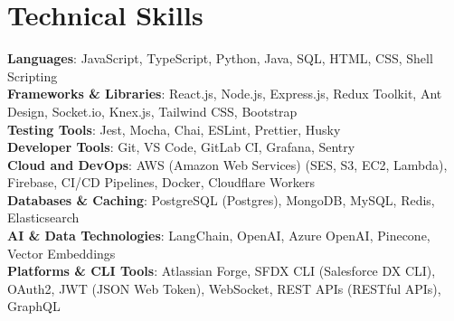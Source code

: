\documentclass[letterpaper,11pt]{article}
\begin{document}
\section{\textbf {Technical Skills}}
\begin{itemize}[leftmargin=0.15in, label={}]
    \small{\item{
       \textbf{Languages}{: JavaScript, TypeScript, Python, Java, SQL, HTML, CSS, Shell Scripting} \\
        \textbf{Frameworks \& Libraries}{: React.js, Node.js, Express.js, Redux Toolkit, Ant Design, Socket.io, Knex.js, Tailwind CSS, Bootstrap} \\
        \textbf{Testing Tools}{: Jest, Mocha, Chai, ESLint, Prettier, Husky} \\
        \textbf{Developer Tools}{: Git, VS Code, GitLab CI, Grafana, Sentry} \\
        \textbf{Cloud and DevOps}{: AWS (Amazon Web Services) (SES, S3, EC2, Lambda), Firebase, CI/CD Pipelines, Docker, Cloudflare Workers} \\
        \textbf{Databases \& Caching}{: PostgreSQL (Postgres), MongoDB, MySQL, Redis, Elasticsearch} \\
        \textbf{AI \& Data Technologies}{: LangChain, OpenAI, Azure OpenAI, Pinecone, Vector Embeddings} \\
        \textbf{Platforms \& CLI Tools}{: Atlassian Forge, SFDX CLI (Salesforce DX CLI), OAuth2, JWT (JSON Web Token), WebSocket, REST APIs (RESTful APIs), GraphQL}
        }}
\end{itemize}
  
\end{document}
